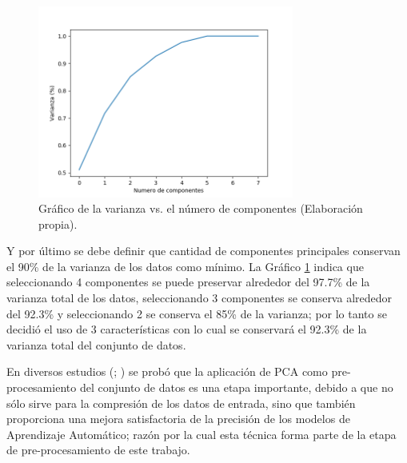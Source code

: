 \begin{figure}[h!]
  \begin{center}	\includegraphics[width=0.75\textwidth,frame]{imagenes/Cap3/pca}
  \caption{Gr\'{a}fico de la varianza vs. el n\'{u}mero de componentes (Elaboraci\'{o}n propia).}
  \label{fig:varianza-pca}
  \end{center}
\end{figure}

\vspace{5mm} %

Y por \'{u}ltimo se debe definir que cantidad de componentes principales conservan el 90\% de la varianza de los datos como m\'{i}nimo. La Gr\'{a}fico \ref{fig:varianza-pca} indica que seleccionando 4 componentes se puede preservar alrededor del 97.7\% de la varianza total de los datos, seleccionando 3 componentes se conserva alrededor del 92.3\% y seleccionando 2 se conserva el 85\% de la varianza; por lo tanto se decidi\'{o} el uso de 3 caracter\'{i}sticas con lo cual se conservar\'{a} el 92.3\% de la varianza total del conjunto de datos.

\vspace{5mm} %

En diversos estudios (; ) se prob\'{o} que la aplicaci\'{o}n de PCA como pre-procesamiento del conjunto de datos es una etapa importante, debido a que no s\'{o}lo sirve para la compresi\'{o}n de los datos de entrada, sino que tambi\'{e}n proporciona una mejora satisfactoria de la precisi\'{o}n de los modelos de Aprendizaje Autom\'{a}tico; raz\'{o}n por la cual esta t\'{e}cnica forma parte de la etapa de pre-procesamiento de este trabajo.


